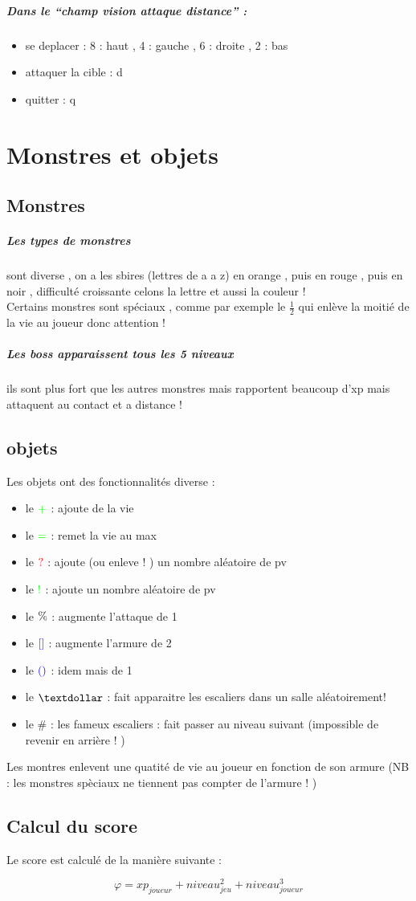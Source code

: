 \documentclass[a4paper,10pt]{article}
\begin{document}
\subparagraph{Dans le ``champ vision attaque distance'' :}
\begin{itemize}
 \item se deplacer : 8 : haut , 4 : gauche , 6 : droite , 2 : bas 
 \item attaquer la cible : d
 \item quitter : q
\end{itemize}


\newpage

\section{Monstres et objets}

\subsection{Monstres}

\subparagraph{Les types de monstres}
sont diverse , on a les sbires (lettres de a a z) en orange , puis en rouge , puis en noir , difficulté croissante 
celons la lettre et aussi la couleur ! \\
Certains monstres sont spéciaux , comme par exemple le $\frac{1}{2}$ qui enlève la moitié de la vie au joueur donc attention !

\subparagraph{Les boss apparaissent tous les 5 niveaux}
ils sont plus fort que les autres monstres mais rapportent beaucoup d'xp mais attaquent au contact et 
a distance !

\subsection{objets}

Les objets ont des fonctionnalités diverse :

\begin{itemize}
 \item le $\textcolor{green}{+}$ : ajoute de la vie
 \item le $\textcolor{green}{=}$ : remet la vie au max
 \item le $\textcolor{red}{?}$ : ajoute (ou enleve ! ) un nombre aléatoire de pv 
 \item le $\textcolor{green}{!}$ : ajoute un nombre aléatoire de pv
 \item le $\textcolor{black}{\%}$ : augmente l'attaque de 1
 \item le $\textcolor{blue}{[]}$ : augmente l'armure de 2
 \item le $\textcolor{blue}{()}$ : idem mais de 1
 \item le $\textdollar$ : fait apparaitre les escaliers  dans un salle aléatoirement!
 \item le \# : les fameux escaliers : fait passer au niveau suivant (impossible de revenir en arrière ! ) 
\end{itemize}


Les montres enlevent une quatité de vie au joueur en fonction de son armure (NB : les monstres spèciaux ne tiennent pas 
compter de l'armure ! )

\subsection{Calcul du score}

Le score est calculé de la manière suivante : 

$$ \varphi = xp_{joueur} + niveau_{jeu}^{2} + niveau_{joueur}^{3} $$
\end{document}
